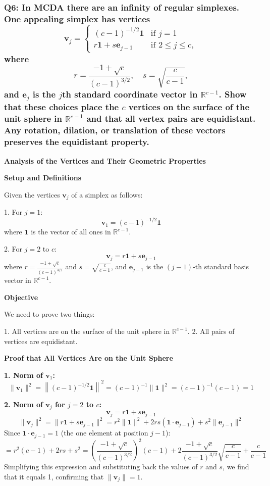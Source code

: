 \documentclass[8pt]{article}
\begin{document}
{\subsubsection*{Q6: In MCDA there are an infinity of regular simplexes. One appealing simplex has vertices
\[
\mathbf{v}_j = 
\begin{cases} 
(c - 1)^{-1/2} \mathbf{1} & \text{if } j = 1 \\ 
r \mathbf{1} + s \mathbf{e}_{j-1} & \text{if } 2 \leq j \leq c, 
\end{cases}
\]
where
\[
r = \frac{-1 + \sqrt{c}}{(c - 1)^{3/2}}, \quad s = \sqrt{\frac{c}{c - 1}},
\]
and \(\mathbf{e}_j\) is the \(j\)th standard coordinate vector in \(\mathbb{R}^{c-1}\). Show that these choices place the \(c\) vertices on the surface of the unit sphere in \(\mathbb{R}^{c-1}\) and that all vertex pairs are equidistant. Any rotation, dilation, or translation of these vectors preserves the equidistant property.}

\textbf{Analysis of the Vertices and Their Geometric Properties}

\textbf{Setup and Definitions}

Given the vertices \( \mathbf{v}_j \) of a simplex as follows:

1. For \( j = 1 \):
   \[
   \mathbf{v}_1 = (c - 1)^{-1/2} \mathbf{1}
   \]
   where \( \mathbf{1} \) is the vector of all ones in \( \mathbb{R}^{c-1} \).

2. For \( j = 2 \) to \( c \):
   \[
   \mathbf{v}_j = r \mathbf{1} + s \mathbf{e}_{j-1}
   \]
   where \( r = \frac{-1 + \sqrt{c}}{(c - 1)^{3/2}} \) and \( s = \sqrt{\frac{c}{c - 1}} \), and \( \mathbf{e}_{j-1} \) is the \((j-1)\)-th standard basis vector in \( \mathbb{R}^{c-1} \).

\textbf{Objective}

We need to prove two things:

1. All vertices are on the surface of the unit sphere in \( \mathbb{R}^{c-1} \).
2. All pairs of vertices are equidistant.

\textbf{Proof that All Vertices Are on the Unit Sphere}

\textbf{1. Norm of \( \mathbf{v}_1 \):}
   \[
   \|\mathbf{v}_1\|^2 = \left\| (c - 1)^{-1/2} \mathbf{1} \right\|^2 = (c - 1)^{-1} \|\mathbf{1}\|^2 = (c - 1)^{-1} (c - 1) = 1
   \]

\textbf{2. Norm of \( \mathbf{v}_j \) for \( j = 2 \) to \( c \):}
   \[
   \mathbf{v}_j = r \mathbf{1} + s \mathbf{e}_{j-1}
   \]
   \[
   \|\mathbf{v}_j\|^2 = \|r \mathbf{1} + s \mathbf{e}_{j-1}\|^2 = r^2 \|\mathbf{1}\|^2 + 2rs (\mathbf{1} \cdot \mathbf{e}_{j-1}) + s^2 \|\mathbf{e}_{j-1}\|^2
   \]
   Since \(\mathbf{1} \cdot \mathbf{e}_{j-1} = 1\) (the one element at position \(j-1\)):
   \[
   = r^2(c-1) + 2rs + s^2 = \left(\frac{-1 + \sqrt{c}}{(c-1)^{3/2}}\right)^2 (c-1) + 2\frac{-1 + \sqrt{c}}{(c-1)^{3/2}} \sqrt{\frac{c}{c-1}} + \frac{c}{c-1}
   \]
   Simplifying this expression and substituting back the values of \(r\) and \(s\), we find that it equals 1, confirming that \( \|\mathbf{v}_j\| = 1 \).

}
\end{document}
